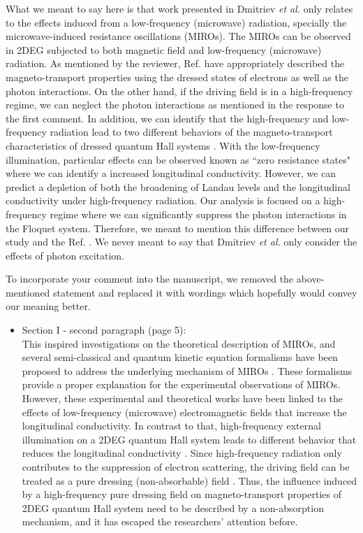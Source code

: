 \documentclass{article}
\begin{document}
What we meant to say here is that work presented in Dmitriev \textit{et al.} \cite{dmitriev09} only relates to the effects induced from a low-frequency (microwave) radiation, specially the microwave-induced resistance oscillations (MIROs). The MIROs can be observed in 2DEG subjected to both magnetic field and low-frequency (microwave) radiation. As mentioned by the reviewer, Ref. \cite{dmitriev09} have appropriately described the magneto-transport properties using the dressed states of electrons as well as the photon interactions. On the other hand, if the driving field is in a high-frequency regime, we can neglect the photon interactions as mentioned in the response to the first comment. In addition, we can identify that the high-frequency and low-frequency radiation lead to two different behaviors of the magneto-transport characteristics of dressed quantum Hall systems \cite{dini16}. With the low-frequency illumination, particular effects can be observed known as ``zero resistance states" where we can identify a increased longitudinal conductivity. However, we can predict a depletion of both the broadening of Landau levels and the longitudinal conductivity under high-frequency radiation.
Our analysis is focused on a high-frequency regime where we can significantly suppress the photon interactions in the Floquet system. Therefore, we meant to mention this difference between our study and the Ref. \cite{dmitriev09}. We never meant to say that Dmitriev \textit{et al.} \cite{dmitriev09} only consider the effects of photon excitation.

To incorporate your comment into the manuscript, we removed the above-mentioned statement and replaced it with wordings which hopefully would convey our meaning better.

\begin{itemize}
  \item Section I - second paragraph (page 5):\\
  {\color{Red}
  This inspired investigations on the theoretical description of MIROs, and several semi-classical and quantum kinetic equation formalisms have been proposed to address the underlying mechanism of MIROs \cite{durst03,dmitriev03,dmitriev05,dmitriev09}. These formalisms provide a proper explanation for the experimental observations of MIROs. However, these experimental and theoretical works have been linked to the effects of low-frequency (microwave) electromagnetic fields that increase the longitudinal conductivity.
  In contrast to that, high-frequency external illumination on a 2DEG quantum Hall system leads to different behavior that reduces the longitudinal conductivity \cite{dini16}.
  Since high-frequency radiation only contributes to the suppression of electron scattering, the driving field can be treated as a pure dressing (non-absorbable) field \cite{dini16}.
  Thus, the influence induced by a high-frequency pure dressing field on
  magneto-transport properties of 2DEG quantum Hall system need to be described by a non-absorption mechanism, and it has escaped the researchers’ attention before.
  }
\end{itemize}
\end{document}

